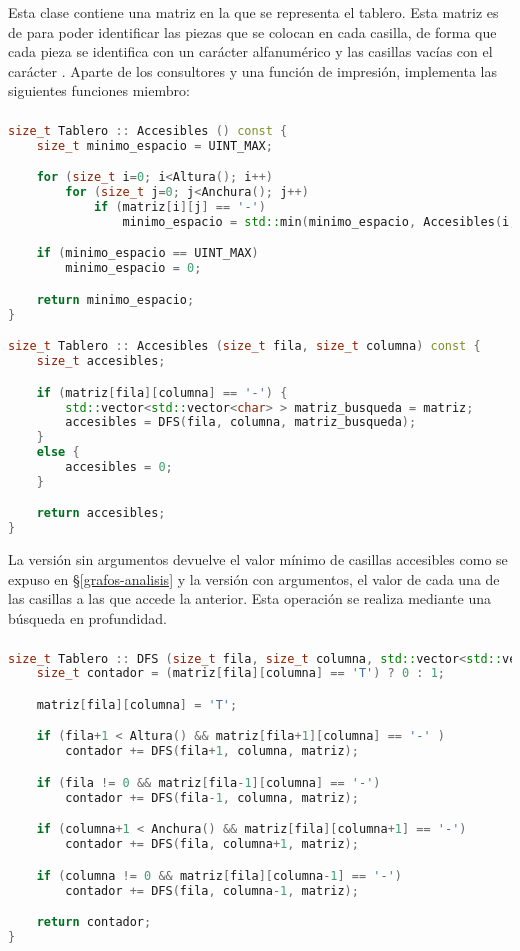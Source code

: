 Esta clase contiene una matriz en la que se representa el tablero.
Esta matriz es de  para poder identificar las piezas que se colocan en cada casilla, de forma que cada pieza se identifica con un carácter alfanumérico y las casillas vacías con el carácter \code{-}.
Aparte de los consultores y una función de impresión, implementa las siguientes funciones miembro:

\pagebreak

\subsubsection{}\label{grafos-implementacion-tablero-accesibles}

\begin{lstlisting}[language=C++]
size_t Tablero :: Accesibles () const {
	size_t minimo_espacio = UINT_MAX;

	for (size_t i=0; i<Altura(); i++)
		for (size_t j=0; j<Anchura(); j++)
			if (matriz[i][j] == '-')
				minimo_espacio = std::min(minimo_espacio, Accesibles(i, j));

	if (minimo_espacio == UINT_MAX)
		minimo_espacio = 0;

	return minimo_espacio;
}

size_t Tablero :: Accesibles (size_t fila, size_t columna) const {
	size_t accesibles;

	if (matriz[fila][columna] == '-') {
		std::vector<std::vector<char> > matriz_busqueda = matriz;
		accesibles = DFS(fila, columna, matriz_busqueda);
	}
	else {
		accesibles = 0;
	}

	return accesibles;
}
\end{lstlisting}

La versión sin argumentos devuelve el valor mínimo de casillas accesibles como se expuso en \S\ref{grafos-analisis} y la versión con argumentos, el valor de cada una de las casillas a las que accede la anterior.
Esta operación se realiza mediante una búsqueda en profundidad.

\subsubsection{}\label{grafos-implementacion-tablero-dfs}

\begin{lstlisting}[language=C++]
size_t Tablero :: DFS (size_t fila, size_t columna, std::vector<std::vector<char> > & matriz) const {
	size_t contador = (matriz[fila][columna] == 'T') ? 0 : 1;

	matriz[fila][columna] = 'T';

	if (fila+1 < Altura() && matriz[fila+1][columna] == '-' )
		contador += DFS(fila+1, columna, matriz);

	if (fila != 0 && matriz[fila-1][columna] == '-')
		contador += DFS(fila-1, columna, matriz);

	if (columna+1 < Anchura() && matriz[fila][columna+1] == '-')
		contador += DFS(fila, columna+1, matriz);

	if (columna != 0 && matriz[fila][columna-1] == '-')
		contador += DFS(fila, columna-1, matriz);

	return contador;
}
\end{lstlisting}

